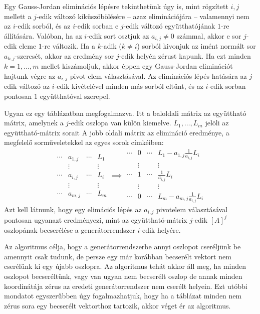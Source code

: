 \documentclass[9pt, showtrims]{memoir}
\theoremstyle{plain}
\theoremstyle{remark}
\theoremstyle{definition}
\begin{document}
Egy Gauss-Jordan eliminációs lépésre tekinthetünk úgy is,
mint rögzített $i,j$ mellett a $j$-edik változó kiküszöbölésére
-- azaz eliminációjára -- 
valamennyi nem az $i$-edik sorból,
és az $i$-edik sorban e $j$-edik változó együtthatójának $1$-re állítására.
Valóban,
ha az $i$-edik sort osztjuk az $a_{i,j}\neq 0$ számmal, akkor e sor $j$-edik
eleme $1$-re változik.
Ha a $k$-adik ($k\neq i$) sorból kivonjuk az imént normált sor
$a_{k,j}$-szeresét, akkor az eredmény sor $j$-edik helyén zérust kapunk.
Ha ezt minden $k=1,\dots,m$ mellet kiszámoljuk, akkor éppen egy Gauss-Jordan
eliminációt hajtunk végre az $a_{i,j}$ pivot elem választásával.
Az eliminációs lépés hatására az $j$-edik változó az $i$-edik kivételével
minden más sorból eltűnt, és az $i$-edik sorban pontosan $1$ együtthatóval szerepel.

Ugyan ez egy táblázatban megfogalmazva. 
Itt a baloldali mátrix az együttható mátrix, amelynek
a $j$-edik oszlopa van külön kiemelve.
$L_1,\dots,L_m$ jelöli az együttható-mátrix sorait
A jobb oldali mátrix az elimináció eredménye, a megfelelő sorműveletekkel az egyes sorok
címkéiben:
\[
    \begin{array}{ccc|c}
        \cdots&a_{1,j}&\cdots&L_1\\
              &\vdots&       &\vdots\\
              \cdots&\boxed{a_{i,j}}&\cdots&L_i\\
              &\vdots&       &\vdots\\
        \cdots&a_{m,j}&\cdots&L_m
    \end{array}
    \implies
    \begin{array}{ccc|c}
        \cdots&0&\cdots&L_1-a_{1,j}\frac{1}{a_{i,j}}L_i\\
              &\vdots&       &\vdots\\
              \cdots&1&\cdots&\frac{1}{a_{i,j}}L_i\\
              &\vdots&       &\vdots\\
              \cdots&0&\cdots&L_m-a_{m,j}\frac{1}{a_{i,j}}L_i
    \end{array}
\]
Azt kell látnunk, hogy egy elimációs lépés az $a_{i,j}$ pivotelem választásával pontosan ugyanazt eredményezi, 
mint az együttható-mátrix $j$-edik $\left[ A \right]^j$ oszlopának becserélése a generátorrendszer $i$-edik helyére. 

Az algoritmus célja, hogy
a generátorrendszerbe annyi oszlopot cseréljünk be amennyit csak tudunk, 
de persze egy már korábban becserélt vektort nem cserélünk ki egy újabb oszlopra.
Az algoritmus tehát akkor áll meg,
ha minden oszlopot becseréltünk, 
vagy van ugyan nem becserélt oszlop de annak minden koordinátája zérus az eredeti generátorrendszer nem cserélt helyein.
Ezt utóbbi mondatot egyszerűbben úgy fogalmazhatjuk, 
hogy ha a táblázat minden nem zérus sora egy becserélt vektorthoz tartozik,
akkor véget ér az algoritmus.
\end{document}
